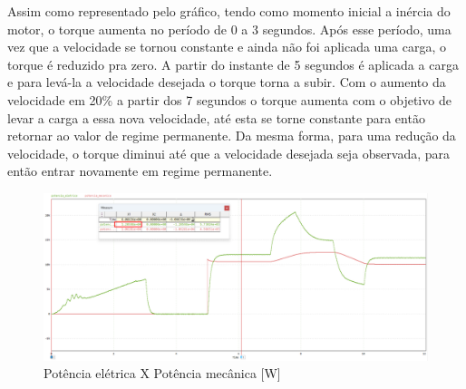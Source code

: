 \documentclass[a4paper, 11pt]{article}
\begin{document}
Assim como representado pelo gráfico, tendo como momento inicial a inércia do motor, o torque aumenta no período de 0 a 3 segundos. Após esse período, uma vez que a velocidade se tornou constante e ainda não foi aplicada uma carga, o torque é reduzido pra zero. A partir do instante de 5 segundos é aplicada a carga e para levá-la a velocidade desejada o torque torna a subir. Com o aumento da velocidade em 20\% a partir dos 7 segundos o torque aumenta com o objetivo de levar a carga a essa nova velocidade, até esta se torne constante para então retornar ao valor de regime permanente. Da mesma forma, para uma redução da velocidade, o torque diminui até que a velocidade desejada seja observada, para então entrar novamente em regime permanente. 

\begin{figure}[H]
    \centering
    \includegraphics[width=1\linewidth]{correcao_pot.png}
    \caption{Potência elétrica X Potência mecânica [W]}
    \label{fig:potencia}
\end{figure}
\end{document}
